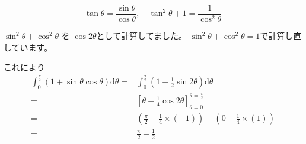 \documentclass[12pt,b5paper]{ltjsarticle}
\begin{document}
\begin{equation}
 \tan\theta = \frac{\sin\theta}{\cos\theta}, \quad \tan^2\theta +1 =\frac{1}{\cos^2\theta}
  \label{tan_cos}
\end{equation}

$\sin^2\theta + \cos^2\theta$ を $\cos 2\theta$として計算してました。
$\sin^2\theta + \cos^2\theta=1$で計算し直しています。

これにより
\begin{align}
 \int_{0}^{\frac{\pi}{2}}
 (1 +\sin\theta\cos\theta)
 \mathrm{d}\theta
 =&  \int_{0}^{\frac{\pi}{2}} \left(1 +\frac{1}{2}\sin2\theta\right) \mathrm{d}\theta\\
 =& \left[ \theta - \frac{1}{4}\cos 2\theta \right]_{\theta=0}^{\theta=\frac{\pi}{2}}\\
 =& \left( \frac{\pi}{2} - \frac{1}{4}\times(-1) \right) - \left( 0 - \frac{1}{4}\times(1) \right)\\
 =& \frac{\pi}{2}+\frac{1}{2}
\end{align}
\end{document}
